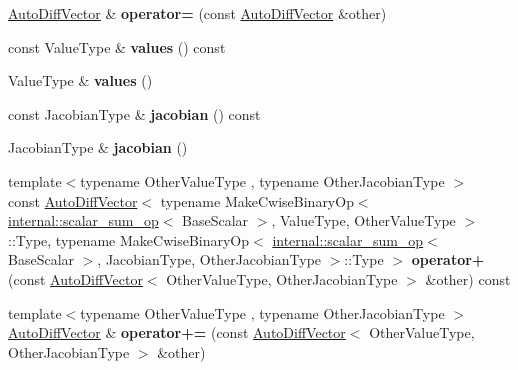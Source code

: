 \begin{DoxyCompactItemize}
\item 
\mbox{\label{class_eigen_1_1_auto_diff_vector_a3af21d242fcc99f1424c2cf1f8cef77e}} 
\hyperlink{class_eigen_1_1_auto_diff_vector}{Auto\+Diff\+Vector} \& {\bfseries operator=} (const \hyperlink{class_eigen_1_1_auto_diff_vector}{Auto\+Diff\+Vector} \&other)
\item 
\mbox{\label{class_eigen_1_1_auto_diff_vector_a9d15830cda59daaf925f307948eea607}} 
const Value\+Type \& {\bfseries values} () const
\item 
\mbox{\label{class_eigen_1_1_auto_diff_vector_aea993221c8ef59c1ce651d51ea5c021b}} 
Value\+Type \& {\bfseries values} ()
\item 
\mbox{\label{class_eigen_1_1_auto_diff_vector_aca679f1915a6bd0e1456532c1f6caba3}} 
const Jacobian\+Type \& {\bfseries jacobian} () const
\item 
\mbox{\label{class_eigen_1_1_auto_diff_vector_a1ea93cae4362f213c53c6ae09ad32f70}} 
Jacobian\+Type \& {\bfseries jacobian} ()
\item 
\mbox{\label{class_eigen_1_1_auto_diff_vector_ad123a9ee90c10e965dbb7d32ffc48565}} 
{\footnotesize template$<$typename Other\+Value\+Type , typename Other\+Jacobian\+Type $>$ }\\const \hyperlink{class_eigen_1_1_auto_diff_vector}{Auto\+Diff\+Vector}$<$ typename Make\+Cwise\+Binary\+Op$<$ \hyperlink{struct_eigen_1_1internal_1_1scalar__sum__op}{internal\+::scalar\+\_\+sum\+\_\+op}$<$ Base\+Scalar $>$, Value\+Type, Other\+Value\+Type $>$\+::Type, typename Make\+Cwise\+Binary\+Op$<$ \hyperlink{struct_eigen_1_1internal_1_1scalar__sum__op}{internal\+::scalar\+\_\+sum\+\_\+op}$<$ Base\+Scalar $>$, Jacobian\+Type, Other\+Jacobian\+Type $>$\+::Type $>$ {\bfseries operator+} (const \hyperlink{class_eigen_1_1_auto_diff_vector}{Auto\+Diff\+Vector}$<$ Other\+Value\+Type, Other\+Jacobian\+Type $>$ \&other) const
\item 
\mbox{\label{class_eigen_1_1_auto_diff_vector_a2459ccb5fe11565e0350c8265ff91c4e}} 
{\footnotesize template$<$typename Other\+Value\+Type , typename Other\+Jacobian\+Type $>$ }\\\hyperlink{class_eigen_1_1_auto_diff_vector}{Auto\+Diff\+Vector} \& {\bfseries operator+=} (const \hyperlink{class_eigen_1_1_auto_diff_vector}{Auto\+Diff\+Vector}$<$ Other\+Value\+Type, Other\+Jacobian\+Type $>$ \&other)

\end{DoxyCompactItemize}
